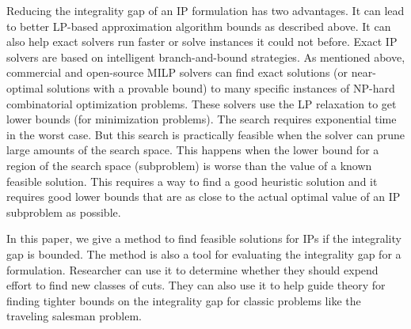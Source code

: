 Reducing the integrality gap of an IP formulation has two advantages.  It can lead to better LP-based approximation algorithm bounds as described above.  It can also help exact solvers run faster or solve instances it could not before. Exact IP solvers are based on intelligent branch-and-bound strategies.  As mentioned above, commercial and open-source MILP solvers can find exact solutions (or near-optimal solutions with a provable bound) to many specific instances of NP-hard combinatorial optimization problems. These solvers use the LP relaxation to get lower bounds (for minimization problems).  The search requires exponential time in the worst case. But this search is practically feasible when the solver can prune large amounts of the search space.  This happens when the lower bound for a region of the search space (subproblem) is worse than the value of a known feasible solution.  This requires a way to find a good heuristic solution and it requires good lower bounds that are as close to the actual optimal value of an IP subproblem as possible.

In this paper, we give a method to find feasible solutions for IPs if the integrality gap is bounded. The method is also a tool for evaluating the integrality gap for a formulation.  Researcher can use it to determine whether they should expend effort to find new classes of cuts.  They can also use it to help guide theory for finding tighter bounds on the integrality gap for classic problems like the traveling salesman problem.



